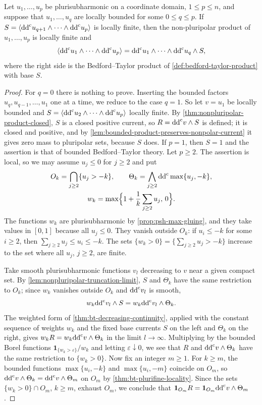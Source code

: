 \begin{proposition}\label{prop:nonpluripolar-bounded-factor-compatibility}
Let $u_1,\ldots,u_p$ be plurisubharmonic on a coordinate domain, $1\leq p\leq n$, and suppose that $u_1,\ldots,u_q$ are locally bounded for some $0\leq q\leq p$. If $S=\langle\mathrm{dd}^{\mathrm{c}} u_{q+1}\wedge\cdots\wedge\mathrm{dd}^{\mathrm{c}} u_p\rangle$ is locally finite, then the non-pluripolar product of $u_1,\ldots,u_p$ is locally finite and
\[
 \langle\mathrm{dd}^{\mathrm{c}} u_1\wedge\cdots\wedge\mathrm{dd}^{\mathrm{c}} u_p\rangle
              =\mathrm{dd}^{\mathrm{c}} u_1\wedge\cdots\wedge\mathrm{dd}^{\mathrm{c}} u_q\wedge S,
\]
where the right side is the Bedford--Taylor product of \cref{def:bedford-taylor-product} with base $S$.
\end{proposition}
\begin{proof}
For $q=0$ there is nothing to prove. Inserting the bounded factors $u_q,u_{q-1},\ldots,u_1$ one at a time, we reduce to the case $q=1$. So let $v=u_1$ be locally bounded and $S=\langle\mathrm{dd}^{\mathrm{c}} u_2\wedge\cdots\wedge\mathrm{dd}^{\mathrm{c}} u_p\rangle$ locally finite. By \cref{thm:nonpluripolar-product-closed}, $S$ is a closed positive current, so $R=\mathrm{dd}^{\mathrm{c}} v\wedge S$ is defined; it is closed and positive, and by \cref{lem:bounded-product-preserves-nonpolar-current} it gives zero mass to pluripolar sets, because $S$ does. If $p=1$, then $S=1$ and the assertion is that of bounded Bedford--Taylor theory. Let $p\geq2$. The assertion is local, so we may assume $u_j\leq0$ for $j\geq2$ and put
\[
 \begin{gathered}
 O_k=\bigcap_{j\geq2}\{u_j>-k\},\qquad
 \Theta_k=\bigwedge_{j\geq2}\mathrm{dd}^{\mathrm{c}}\max\{u_j,-k\},\\
 w_k=\max\Bigl\{1+\frac1k\sum_{j\geq2}u_j,\,0\Bigr\}.
 \end{gathered}
\]
The functions $w_k$ are plurisubharmonic by \cref{prop:psh-max-gluing}, and they take values in $[0,1]$ because all $u_j\leq0$. They vanish outside $O_k$: if $u_i\leq-k$ for some $i\geq2$, then $\sum_{j\geq2}u_j\leq u_i\leq-k$. The sets $\{w_k>0\}=\{\sum_{j\geq2}u_j>-k\}$ increase to the set where all $u_j$, $j\geq2$, are finite.

Take smooth plurisubharmonic functions $v_l$ decreasing to $v$ near a given compact set. By \cref{lem:nonpluripolar-truncation-limit}, $S$ and $\Theta_k$ have the same restriction to $O_k$; since $w_k$ vanishes outside $O_k$ and $\mathrm{dd}^{\mathrm{c}} v_l$ is smooth,
\[
 w_k\mathrm{dd}^{\mathrm{c}} v_l\wedge S=w_k\mathrm{dd}^{\mathrm{c}} v_l\wedge\Theta_k.
\]
The weighted form of \cref{thm:bt-decreasing-continuity}, applied with the constant sequence of weights $w_k$ and the fixed base currents $S$ on the left and $\Theta_k$ on the right, gives $w_kR=w_k\mathrm{dd}^{\mathrm{c}} v\wedge\Theta_k$ in the limit $l\to\infty$. Multiplying by the bounded Borel functions $\mathbf1_{\{w_k>\varepsilon\}}/w_k$ and letting $\varepsilon\downarrow0$, we see that $R$ and $\mathrm{dd}^{\mathrm{c}} v\wedge\Theta_k$ have the same restriction to $\{w_k>0\}$. Now fix an integer $m\geq1$. For $k\geq m$, the bounded functions $\max\{u_i,-k\}$ and $\max\{u_i,-m\}$ coincide on $O_m$, so $\mathrm{dd}^{\mathrm{c}} v\wedge\Theta_k=\mathrm{dd}^{\mathrm{c}} v\wedge\Theta_m$ on $O_m$ by \cref{thm:bt-plurifine-locality}. Since the sets $\{w_k>0\}\cap O_m$, $k\geq m$, exhaust $O_m$, we conclude that $\mathbf1_{O_m}R=\mathbf1_{O_m}\mathrm{dd}^{\mathrm{c}} v\wedge\Theta_m$.


\end{proof}
